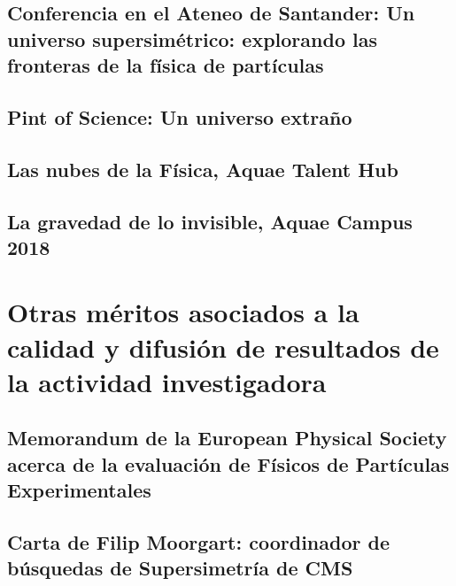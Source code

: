 \documentclass[a4paper, 11pt, twoside, openright]{report}
\begin{document}
\subsection{Conferencia en el Ateneo de Santander: Un universo supersimétrico: explorando las fronteras de la física de partículas}


\subsection{Pint of Science: Un universo extraño}


\subsection{Las nubes de la Física, Aquae Talent Hub}


\subsection{La gravedad de lo invisible, Aquae Campus 2018} 




\section{Otras méritos asociados a la calidad y difusión de resultados de la actividad investigadora}
\subsection{Memorandum de la European Physical Society acerca de la evaluación de Físicos de Partículas Experimentales}

\subsection{Carta de Filip Moorgart: coordinador de búsquedas de Supersimetría de CMS}

\end{document}
